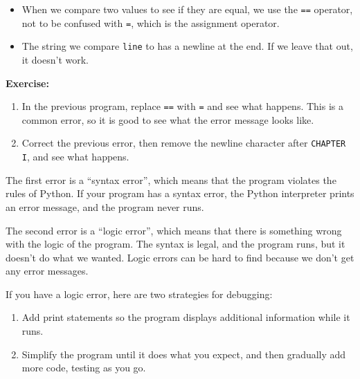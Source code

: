 \begin{itemize}
\item
  When we compare two values to see if they are equal, we use the
  \passthrough{\lstinline!==!} operator, not to be confused with
  \passthrough{\lstinline!=!}, which is the assignment operator.
\item
  The string we compare \passthrough{\lstinline!line!} to has a newline
  at the end. If we leave that out, it doesn't work.
\end{itemize}

\textbf{Exercise:}

\begin{enumerate}
\def\labelenumi{\arabic{enumi}.}
\item
  In the previous program, replace \passthrough{\lstinline!==!} with
  \passthrough{\lstinline!=!} and see what happens. This is a common
  error, so it is good to see what the error message looks like.
\item
  Correct the previous error, then remove the newline character after
  \passthrough{\lstinline!CHAPTER I!}, and see what happens.
\end{enumerate}

The first error is a ``syntax error'', which means that the program
violates the rules of Python. If your program has a syntax error, the
Python interpreter prints an error message, and the program never runs.

The second error is a ``logic error'', which means that there is
something wrong with the logic of the program. The syntax is legal, and
the program runs, but it doesn't do what we wanted. Logic errors can be
hard to find because we don't get any error messages.

If you have a logic error, here are two strategies for debugging:

\begin{enumerate}
\def\labelenumi{\arabic{enumi}.}
\item
  Add print statements so the program displays additional information
  while it runs.
\item
  Simplify the program until it does what you expect, and then gradually
  add more code, testing as you go.
\end{enumerate}

